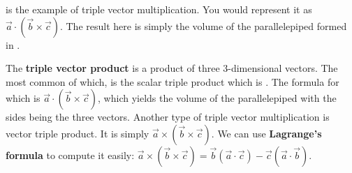  is the example of triple vector multiplication. You would represent it as \(\vec{a} \cdot (\vec{b} \times \vec{c})\). The result here is simply the volume of the parallelepiped formed in .
\begin{definition}
  The \textbf{triple vector product} is a product of three 3-dimensional vectors. The most common of which, is the scalar triple product which is . The formula for which is \(\vec{a}\cdot(\vec{b}\times\vec{c})\), which yields the volume of the parallelepiped with the sides being the three vectors. Another type of triple vector multiplication is vector triple product. It is simply \(\vec{a}\times(\vec{b}\times\vec{c})\). We can use \textbf{Lagrange's formula} to compute it easily: \(\vec{a}\times(\vec{b}\times\vec{c}) = \vec{b}(\vec{a}\cdot\vec{c}) - \vec{c}(\vec{a}\cdot\vec{b})\).
\end{definition}
